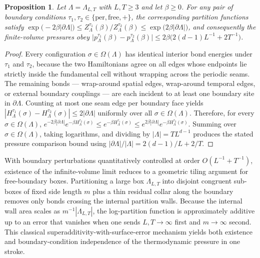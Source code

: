 \documentclass[11pt]{article}
\newtheorem{proposition}[theorem]{Proposition}
\theoremstyle{definition}
\begin{document}
\begin{proposition}
\label{prop:s02-boundary-ratio}
Let $\Lambda = \Lambda_{L,T}$ with $L, T \ge 3$ and let $\beta \ge 0$. For any pair
of boundary conditions $\tau_1, \tau_2 \in \{\mathrm{per}, \mathrm{free}, +\}$, the
corresponding partition functions satisfy $\exp\!\bigl(-2\beta |\partial
\Lambda|\bigr) \le Z_\Lambda^{\tau_1}(\beta) / Z_\Lambda^{\tau_2}(\beta) \le
\exp\!\bigl(2\beta |\partial \Lambda|\bigr)$, and consequently the finite-volume
pressures obey $\bigl| p_\Lambda^{\tau_1}(\beta) - p_\Lambda^{\tau_2}(\beta) \bigr|
\le 2 \beta \bigl(2(d-1) L^{-1} + 2 T^{-1}\bigr)$.
\end{proposition}
\begin{proof}
Every configuration $\sigma \in \Omega(\Lambda)$ has identical interior bond
energies under $\tau_1$ and $\tau_2$, because the two Hamiltonians agree on all
edges whose endpoints lie strictly inside the fundamental cell without wrapping
across the periodic seams. The remaining bonds --- wrap-around spatial edges,
wrap-around temporal edges, or external boundary couplings --- are each incident to
at least one boundary site in $\partial \Lambda$. Counting at most one seam edge per
boundary face yields $|H_\Lambda^{\tau_1}(\sigma) - H_\Lambda^{\tau_2}(\sigma)| \le
2 |\partial \Lambda|$ uniformly over all $\sigma \in \Omega(\Lambda)$. Therefore,
for every $\sigma \in \Omega(\Lambda)$, $e^{-2\beta |\partial \Lambda|} e^{-\beta
H_\Lambda^{\tau_2}(\sigma)} \le e^{-\beta H_\Lambda^{\tau_1}(\sigma)} \le e^{2\beta
|\partial \Lambda|} e^{-\beta H_\Lambda^{\tau_2}(\sigma)}$. Summing over $\sigma \in
\Omega(\Lambda)$, taking logarithms, and dividing by $|\Lambda| = T L^{d-1}$
produces the stated pressure comparison bound using $|\partial \Lambda| / |\Lambda|
= 2(d-1)/L + 2/T$.
\end{proof}

With boundary perturbations quantitatively controlled at order $O(L^{-1} + T^{-1})$,
existence of the infinite-volume limit reduces to a geometric tiling argument for
free-boundary boxes. Partitioning a large box $\Lambda_{L,T}$ into disjoint
congruent sub-boxes of fixed side length $m$ plus a thin residual collar along the
boundary removes only bonds crossing the internal partition walls. Because the
internal wall area scales as $m^{-1} |\Lambda_{L,T}|$, the log-partition function is
approximately additive up to an error that vanishes when one sends $L, T \to \infty$
first and $m \to \infty$ second. This classical superadditivity-with-surface-error
mechanism yields both existence and boundary-condition independence of the
thermodynamic pressure in one stroke.
\end{document}
